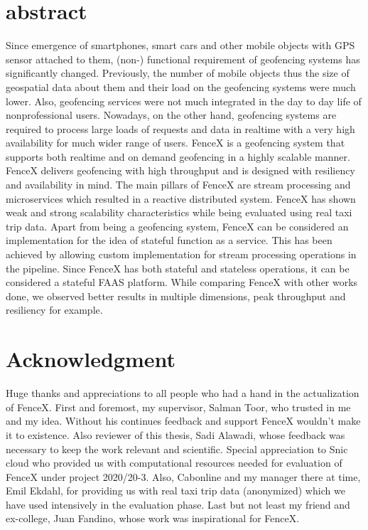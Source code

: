 \documentclass[a4]{report}
\begin{document}
    \section{abstract}
    Since emergence of smartphones, smart cars and other mobile objects with GPS sensor attached to them, (non-)
    functional requirement of geofencing systems has significantly changed.
    Previously, the number of mobile objects thus the size of geospatial data about them and their load on the
    geofencing systems were much lower.
    Also, geofencing services were not much integrated in the day to day life of nonprofessional users.
    Nowadays, on the other hand, geofencing systems are required to process large loads of requests and data in
    realtime with a very high availability for much wider range of users.
    FenceX is a geofencing system that supports both realtime and on demand geofencing in a highly scalable manner.
    FenceX delivers geofencing with high throughput and is designed with resiliency and availability in mind.
    The main pillars of FenceX are stream processing and microservices which resulted in a reactive distributed
    system.
    FenceX has shown weak and strong scalability characteristics while being evaluated using real taxi trip data.
    Apart from being a geofencing system, FenceX can be considered an implementation for the idea of stateful function
    as a service.
    This has been achieved by allowing custom implementation for stream processing operations in the pipeline.
    Since FenceX has both stateful and stateless operations, it can be considered a stateful FAAS platform.
    While comparing FenceX with other works done, we observed better results in multiple dimensions, peak throughput
    and resiliency for example.

    \newpage

    \tableofcontents

    \listoffigures

    \listoftables

    \newpage

    \section{Acknowledgment}
    Huge thanks and appreciations to all people who had a hand in the actualization of FenceX.
    First and foremost, my supervisor, Salman Toor, who trusted in me and my idea.
    Without his continues feedback and support FenceX wouldn't make it to existence.
    Also reviewer of this thesis, Sadi Alawadi, whose feedback was necessary to keep the work relevant and scientific.
    Special appreciation to Snic cloud who provided us with computational resources needed for evaluation of FenceX
    under project 2020/20-3.
    Also, Cabonline and my manager there at time,  Emil Ekdahl, for providing us with real taxi trip data
    (anonymized) which we have used intensively in the evaluation phase.
    Last but not least my friend and ex-college, Juan Fandino, whose work was inspirational for FenceX.
\end{document}
